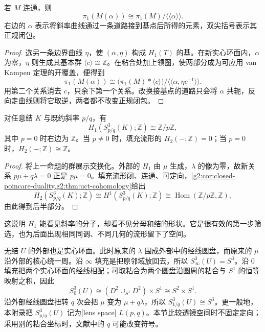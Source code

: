 \begin{proposition}\label{g2:prop:dehn-filling-group}
	若 \(M\) 连通，则
	\[
		\pi_1(M(\alpha))\cong\pi_1(M)/\langle\!\langle\alpha\rangle\!\rangle.
	\]
	右边的 \(\alpha\) 表示将斜率曲线通过一条道路接到基点后所得的元素，双尖括号表示其正规闭包。
\end{proposition}
\begin{proof}
	选另一条边界曲线 \(\eta\)，使 \((\alpha,\eta)\) 构成 \(H_1(T)\) 的基。在新实心环面内，\(\alpha\) 为零，\(\eta\) 则生成其基本群 \(\langle c\rangle\cong\mathbb Z\)。在粘合处加上领圈，使两部分成为可应用 van Kampen 定理的开覆盖，便得到
	\[
		\pi_1(M(\alpha))\cong
		\bigl(\pi_1(M)*\langle c\rangle\bigr)/\langle\!\langle\alpha,\eta c^{-1}\rangle\!\rangle.
	\]
	用第二个关系消去 \(c\)，只余下第一个关系。改换接基点的道路只会将 \(\alpha\) 共轭，反向走曲线则将它取逆，两者都不改变正规闭包。
\end{proof}

\begin{proposition}\label{g2:prop:knot-filling-homology}
	对任意结 \(K\) 与既约斜率 \(p/q\)，有
	\[
		H_1(S^3_{p/q}(K);\mathbb Z)\cong\mathbb Z/p\mathbb Z,
	\]
	其中 \(p=0\) 时右边为 \(\mathbb Z\)。当 \(p\ne0\) 时，填充流形的 \(H_2(-;\mathbb Z)=0\)；当 \(p=0\) 时，\(H_2(-;\mathbb Z)\cong\mathbb Z\)。
\end{proposition}
\begin{proof}
	将上一命题的群展示交换化。外部的 \(H_1\) 由 \(\mu\) 生成，\(\lambda\) 的像为零，故新关系 \(p\mu+q\lambda=0\) 正是 \(p\mu=0\)。填充流形闭、连通、可定向，\cref{g2:cor:closed-poincare-duality,g2:thm:uct-cohomology}给出
	\[
		H_2(S^3_{p/q}(K);\mathbb Z)\cong H^1(S^3_{p/q}(K);\mathbb Z)
		\cong\operatorname{Hom}(\mathbb Z/p\mathbb Z,\mathbb Z),
	\]
	由此得到后半部分。
\end{proof}

这说明 \(H_1\) 能看见斜率的分子，却看不见分母和结的形状。它是很有效的第一步筛选，也为后面出现相同同调、不同几何的流形留下了空间。

\begin{example}\label{g2:exm:unknot-filling}
	无结 \(U\) 的外部也是实心环面。此时原来的 \(\lambda\) 围成外部中的经线圆盘，而原来的 \(\mu\) 沿外部的核心绕一周。沿 \(\infty\) 填充是把原邻域放回去，所以 \(S^3_{\infty}(U)=S^3\)。沿 \(0\) 填充把两个实心环面的经线相配；可取粘合为两个圆盘沿圆周的粘合与 \(S^1\) 的恒等映射之积，因此
	\[
		S^3_0(U)\cong(D^2\cup_{S^1}D^2)\times S^1\cong S^2\times S^1.
	\]
	沿外部经线圆盘扭转 \(q\) 次会把 \(\mu\) 变为 \(\mu+q\lambda\)，所以 \(S^3_{1/q}(U)\cong S^3\)。更一般地，本附录把 \(S^3_{p/q}(U)\) 记为[lens space] \(L(p,q)\)。本节比较透镜空间时不固定定向；采用别的粘合坐标时，文献中的 \(q\) 可能改变符号。
\end{example}

